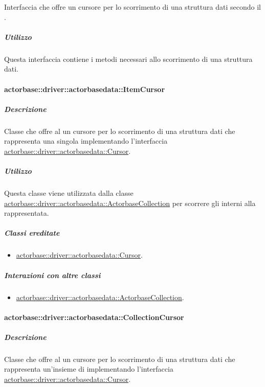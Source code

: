 \documentclass{scalatekids-article}
\begin{document}
Interfaccia che offre un cursore per lo scorrimento di una struttura dati
secondo il  .

\subparagraph{Utilizzo}

Questa interfaccia contiene i metodi necessari allo scorrimento di una
struttura dati.

\paragraph{actorbase::driver::actorbasedata::ItemCursor}
\label{sec:actorbase::driver::actorbasedata::ItemCursor}

\subparagraph{Descrizione}

Classe che offre al  un cursore per lo scorrimento di una struttura dati
che rappresenta una singola  implementando l'interfaccia
\hyperref[sec:actorbase::driver::actorbasedata::Cursor]{actorbase::driver::actorbasedata::Cursor}.

\subparagraph{Utilizzo}

Questa classe viene utilizzata dalla classe
\hyperref[sec:actorbase::driver::actorbasedata::ActorbaseCollection]{actorbase::driver::actorbasedata::ActorbaseCollection}
per scorrere gli  interni alla 
rappresentata.

\subparagraph{Classi ereditate}

\begin{itemize}
\item \hyperref[sec:actorbase::driver::actorbasedata::Cursor]{actorbase::driver::actorbasedata::Cursor}.
\end{itemize}

\subparagraph{Interazioni con altre classi}

\begin{itemize}
\item \hyperref[sec:actorbase::driver::actorbasedata::ActorbaseCollection]{actorbase::driver::actorbasedata::ActorbaseCollection}.
\end{itemize}

\paragraph{actorbase::driver::actorbasedata::CollectionCursor}
\label{sec:actorbase::driver::actorbasedata::CollectionCursor}

\subparagraph{Descrizione}

Classe che offre al  un cursore per lo scorrimento di una struttura dati
che rappresenta un'insieme di  implementando l'interfaccia
\hyperref[sec:actorbase::driver::actorbasedata::Cursor]{actorbase::driver::actorbasedata::Cursor}.
\end{document}
